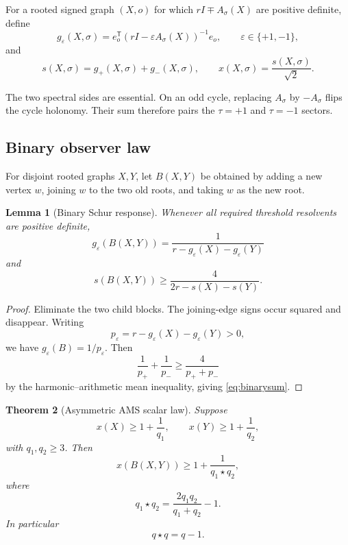 \documentclass[11pt]{article}
\newtheorem{theorem}{Theorem}[section]
\newtheorem{lemma}[theorem]{Lemma}
\newcommand{\eps}{\varepsilon}
\newcommand{\sgn}{\sigma}
\newcommand{\starop}{\mathbin{\star}}
\begin{document}
For a rooted signed graph $(X,o)$ for which $rI\mp A_\sgn(X)$ are positive definite, define
\begin{equation}\label{eq:gdef}
 g_\eps(X,\sgn)
 =e_o^{\mathsf T}(rI-\eps A_\sgn(X))^{-1}e_o,
 \qquad \eps\in\{+1,-1\},
\end{equation}
and
\begin{equation}\label{eq:sxdef}
 s(X,\sgn)=g_+(X,\sgn)+g_-(X,\sgn),
 \qquad x(X,\sgn)=\frac{s(X,\sgn)}{\sqrt2}.
\end{equation}

The two spectral sides are essential.  On an odd cycle, replacing $A_\sgn$ by $-A_\sgn$ flips the cycle holonomy.  Their sum therefore pairs the $\tau=+1$ and $\tau=-1$ sectors.

\subsection{Binary observer law}

For disjoint rooted graphs $X,Y$, let $B(X,Y)$ be obtained by adding a new vertex $w$, joining $w$ to the two old roots, and taking $w$ as the new root.

\begin{lemma}[Binary Schur response]\label{lem:binary}
Whenever all required threshold resolvents are positive definite,
\[
 g_\eps(B(X,Y))
 =\frac{1}{r-g_\eps(X)-g_\eps(Y)}
\]
and
\begin{equation}\label{eq:binarysum}
 s(B(X,Y))\ge
 \frac{4}{2r-s(X)-s(Y)}.
\end{equation}
\end{lemma}

\begin{proof}
Eliminate the two child blocks.  The joining-edge signs occur squared and disappear.  Writing
\[
 p_\eps=r-g_\eps(X)-g_\eps(Y)>0,
\]
we have $g_\eps(B)=1/p_\eps$.  Then
\[
 \frac1{p_+}+\frac1{p_-}\ge\frac4{p_++p_-}
\]
by the harmonic--arithmetic mean inequality, giving \eqref{eq:binarysum}.
\end{proof}

\begin{theorem}[Asymmetric AMS scalar law]\label{thm:star}
Suppose
\[
 x(X)\ge1+\frac1{q_1},\qquad
 x(Y)\ge1+\frac1{q_2},
\]
with $q_1,q_2\ge3$.  Then
\[
 x(B(X,Y))\ge1+\frac1{q_1\starop q_2},
\]
where
\begin{equation}\label{eq:star}
 \boxed{q_1\starop q_2=\frac{2q_1q_2}{q_1+q_2}-1.}
\end{equation}
In particular
\begin{equation}\label{eq:equalstar}
 q\starop q=q-1.
\end{equation}
\end{theorem}
\end{document}
